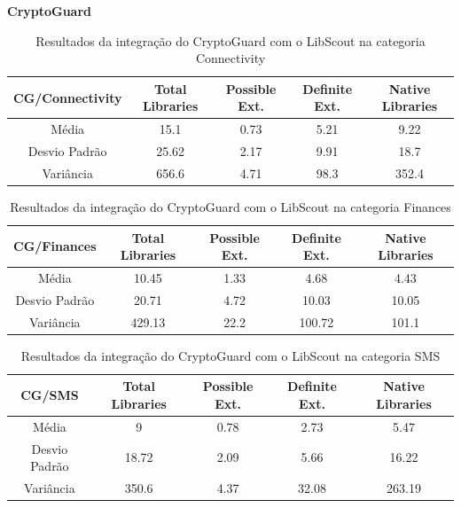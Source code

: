 \textbf{CryptoGuard}

\begin{table}[!htbp]
  \centering
  \small
  \begin{tabular}{|c|c|c|c|c|}
    \hline
    \textbf{CG/Connectivity} & \textbf{Total Libraries} & \textbf{Possible Ext.} & \textbf{Definite Ext.} & \textbf{Native Libraries} \\
    \hline
    Média & \num{15.1} & \num{0.73} & \num{5.21} & \num{9.22} \\
    Desvio Padrão & \num{25.62} & \num{2.17} & \num{9.91} & \num{18.7} \\
    Variância & \num{656.6} & \num{4.71} & \num{98.3} & \num{352.4} \\
    \hline
  \end{tabular}
  \caption{Resultados da integração do CryptoGuard com o LibScout na categoria Connectivity}
  \label{table: AplicativosComWarningCGC}
\end{table}


\begin{table}[!htbp]
  \centering
  \small
  \begin{tabular}{|c|c|c|c|c|}
    \hline
    \textbf{CG/Finances} & \textbf{Total Libraries} & \textbf{Possible Ext.} & \textbf{Definite Ext.} & \textbf{Native Libraries} \\
    \hline
    Média & \num{10.45} & \num{1.33} & \num{4.68} & \num{4.43} \\
    Desvio Padrão & \num{20.71} & \num{4.72} & \num{10.03} & \num{10.05} \\
    Variância & \num{429.13} & \num{22.2} & \num{100.72} & \num{101.1} \\
    \hline
  \end{tabular}
  \caption{Resultados da integração do CryptoGuard com o LibScout na categoria Finances}
  \label{table: AplicativosComWarningCGF}
\end{table}


\begin{table}[!htbp]
  \centering
  \small
  \begin{tabular}{|c|c|c|c|c|}
    \hline
    \textbf{CG/SMS} & \textbf{Total Libraries} & \textbf{Possible Ext.} & \textbf{Definite Ext.} & \textbf{Native Libraries} \\
    \hline
    Média & \num{9} & \num{0.78} & \num{2.73} & \num{5.47} \\
    Desvio Padrão & \num{18.72} & \num{2.09} & \num{5.66} & \num{16.22} \\
    Variância & \num{350.6} & \num{4.37} & \num{32.08} & \num{263.19} \\
    \hline
  \end{tabular}
  \caption{Resultados da integração do CryptoGuard com o LibScout na categoria SMS}
  \label{table: AplicativosComWarningCGSMS}
\end{table}


